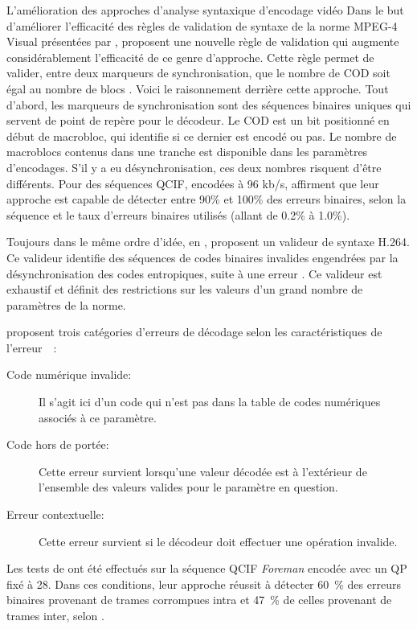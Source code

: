 \begin{section}{L'amélioration des approches d'analyse syntaxique d'encodage
vidéo}
\label{sect-SyntaxeAnalysis}
Dans le but d'améliorer l'efficacité des règles de validation de syntaxe de la
norme MPEG-4 Visual présentées par \citet{Talluri1998}, \citeauthor{Yan2003}
proposent une nouvelle règle de validation qui augmente considérablement
l'efficacité de ce genre d'approche. Cette règle permet de valider, entre deux
marqueurs de synchronisation, que le nombre de COD soit égal au nombre de blocs
\citep{Yan2003}. Voici le raisonnement derrière cette approche. Tout
d'abord, les marqueurs de synchronisation sont des séquences binaires uniques
qui servent de point de repère pour le décodeur. Le COD est un bit positionné en
début de macrobloc, qui identifie si ce dernier est encodé ou pas. Le nombre de
macroblocs contenus dans une tranche est disponible dans les paramètres
d'encodages. S'il y a eu désynchronisation, ces deux nombres risquent d'être
différents. Pour des séquences QCIF, encodées à 96 kb/s, \citet{Yan2003}
affirment que leur approche est capable de détecter entre 90\% et 100\% des
erreurs binaires, selon la séquence et le taux d'erreurs binaires utilisés
(allant de 0.2\% à 1.0\%).

Toujours dans le même ordre d'idée, en \citeyear{Superiori2006},
\citeauthor{Superiori2006} proposent un valideur de syntaxe H.264. Ce valideur
identifie des séquences de codes binaires invalides engendrées par la
désynchronisation des codes entropiques, suite à une erreur
\citep{Superiori2006}. Ce valideur est exhaustif et définit des restrictions sur
les valeurs d'un grand nombre de paramètres de la norme.


\citeauthor{Superiori2006} proposent trois catégories d'erreurs de
décodage selon les caractéristiques de l'erreur~\citep{Superiori2006}~:
\begin{description}
 	\item[\bul Code numérique invalide:] Il s'agit ici d'un code
 	qui n'est pas dans la table de codes numériques associés à ce paramètre.
 	\item[\bul Code hors de portée:] Cette erreur survient lorsqu'une valeur
 	décodée est à l'extérieur de l'ensemble des valeurs valides pour le paramètre en question.
 	\item[\bul Erreur contextuelle:] Cette erreur survient si le
 	décodeur doit effectuer une opération invalide.
\end{description}

Les tests de \citeauthor{Superiori2006} ont été effectués sur la séquence QCIF
\textit{Foreman} encodée avec un QP fixé à 28. Dans ces conditions, leur
approche réussit à détecter 60~\% des erreurs binaires provenant de trames
corrompues intra et 47~\% de celles provenant de trames inter, selon
\citep{Superiori2006}.
\end{section}

